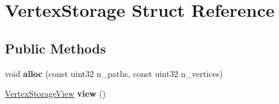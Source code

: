 \hypertarget{struct_vertex_storage}{}\section{Vertex\+Storage Struct Reference}
\label{struct_vertex_storage}
\subsection*{Public Methods}
\begin{DoxyCompactItemize}
\item 
\mbox{\label{struct_vertex_storage_afdba264848b1a20e48aeab491ad93c18}} 
void {\bfseries alloc} (const uint32 n\+\_\+paths, const uint32 n\+\_\+vertices)
\item 
\mbox{\label{struct_vertex_storage_a628e950c0d5fdd779147d00c369bfd98}} 
\hyperlink{struct_vertex_storage_view}{Vertex\+Storage\+View} {\bfseries view} ()
\end{DoxyCompactItemize}
